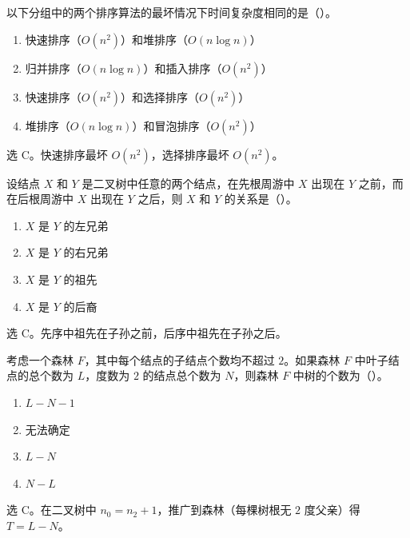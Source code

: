 \begin{question}
以下分组中的两个排序算法的最坏情况下时间复杂度相同的是（\quad）。
\begin{enumerate}
  \item 快速排序（$O(n^2)$）和堆排序（$O(n\log n)$）
  \item 归并排序（$O(n\log n)$）和插入排序（$O(n^2)$）
  \item 快速排序（$O(n^2)$）和选择排序（$O(n^2)$）
  \item 堆排序（$O(n\log n)$）和冒泡排序（$O(n^2)$）
\end{enumerate}
\begin{solution}
选 C。快速排序最坏 $O(n^2)$，选择排序最坏 $O(n^2)$。
\end{solution}
\end{question}

\begin{question}
设结点 $X$ 和 $Y$ 是二叉树中任意的两个结点，在先根周游中 $X$ 出现在 $Y$ 之前，而在后根周游中 $X$ 出现在 $Y$ 之后，则 $X$ 和 $Y$ 的关系是（\quad）。
\begin{enumerate}
  \item $X$ 是 $Y$ 的左兄弟
  \item $X$ 是 $Y$ 的右兄弟
  \item $X$ 是 $Y$ 的祖先
  \item $X$ 是 $Y$ 的后裔
\end{enumerate}
\begin{solution}
选 C。先序中祖先在子孙之前，后序中祖先在子孙之后。
\end{solution}
\end{question}

\begin{question}
考虑一个森林 $F$，其中每个结点的子结点个数均不超过 $2$。如果森林 $F$ 中叶子结点的总个数为 $L$，度数为 $2$ 的结点总个数为 $N$，则森林 $F$ 中树的个数为（\quad）。
\begin{enumerate}
  \item $L-N-1$
  \item 无法确定
  \item $L-N$
  \item $N-L$
\end{enumerate}
\begin{solution}
选 C。在二叉树中 $n_0=n_2+1$，推广到森林（每棵树根无 $2$ 度父亲）得 $T=L-N$。
\end{solution}
\end{question}

